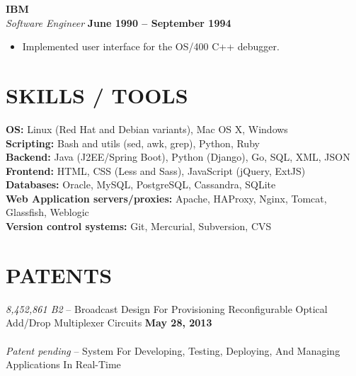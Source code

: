 \documentclass[margin,line]{resume}
\begin{document}
\begin{resume}
    \textbf{\listing IBM} \vspace{2mm}\\\vspace{1mm}%
    \textsl{Software Engineer} \hfill \textbf{June 1990 -- September 1994}\
    \begin{itemize}
        \item Implemented user interface for the OS/400 C++ debugger.
    \end{itemize}
    

    \vspace{32mm}

\sectionline

    \section{\mysidestyle \textbf{\large{S}\small{KILLS} / \large{T}\small{OOLS}}}
    \textbf{OS:} Linux (Red Hat and Debian variants), Mac OS X, Windows \\
    \textbf{Scripting:} Bash and utils (sed, awk, grep), Python, Ruby\\
    \textbf{Backend:} Java (J2EE/Spring Boot), Python (Django), Go, SQL, XML, JSON\\
    \textbf{Frontend:} HTML, CSS (Less and Sass), JavaScript (jQuery, ExtJS)\\
    \textbf{Databases:} Oracle, MySQL, PostgreSQL, Cassandra, SQLite\\
    \textbf{Web Application servers/proxies:} Apache, HAProxy, Nginx, Tomcat, Glassfish, Weblogic\\
    \textbf{Version control systems:} Git, Mercurial, Subversion, CVS\\

\sectionline

    \section{\mysidestyle \textbf{\large{P}\small{ATENTS}}}
    \textsl{8,452,861 B2} -- Broadcast Design For Provisioning Reconfigurable Optical Add/Drop Multiplexer Circuits \hfill \textbf{May 28, 2013}\\\\
    \textsl{Patent pending} -- System For Developing, Testing, Deploying, And Managing Applications In Real-Time\\
    \vspace{-4mm}


\end{resume}
\end{document}

